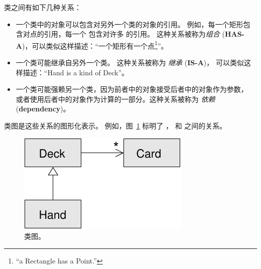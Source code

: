 
类之间有如下几种关系：

\begin{itemize}


\item 一个类中的对象可以包含对另外一个类的对象的引用。
例如，每一个矩形包含对点的引用，每一个  包含对许多  的引用。 这种关系被称为{\em 组合} ({\bf HAS-A})，可以类似这样描述：``一个矩形有一个点\footnote{``a Rectangle has a Point.''}''。


\item 一个类可能继承自另外一个类。
这种关系被称为 {\em 继承} ({\bf IS-A})， 可以类似这样描述：``Hand is a kind of Deck''。


\item 一个类可能强赖另一个类，因为前者中的对象接受后者中的对象作为参数，
或者使用后者中的对象作为计算的一部分。这种关系被称为 {\em 依赖} ({\bf dependency})。

\end{itemize}



类图是这些关系的图形化表示。  例如，图~\ref{fig.class1} 标明了  ，  和
 之间的关系。

\begin{figure}
\centerline
{\includegraphics[scale=0.8]{../source/figs/class1.pdf}}
\caption{类图。}
\label{fig.class1}
\end{figure}

